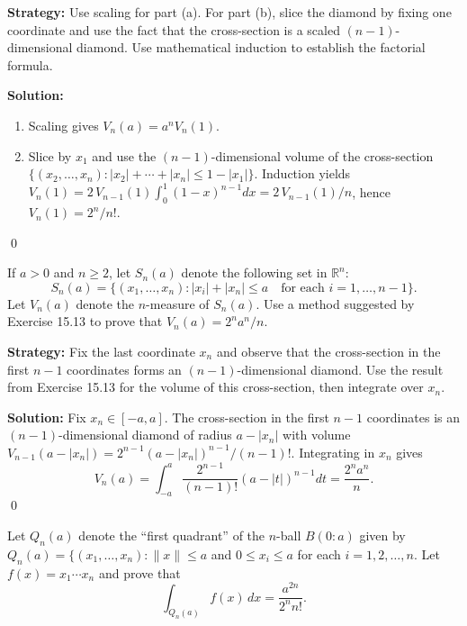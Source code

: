 \noindent\textbf{Strategy:} Use scaling for part (a). For part (b), slice the diamond by fixing one coordinate and use the fact that the cross-section is a scaled \((n-1)\)-dimensional diamond. Use mathematical induction to establish the factorial formula.

\bigskip\noindent\textbf{Solution:}
\begin{enumerate}[label=(\alph*)]
\item Scaling gives \(V_n(a)=a^n V_n(1)\).
\item Slice by \(x_1\) and use the \((n-1)\)-dimensional volume of the cross-section \(\{(x_2,\ldots,x_n): |x_2|+\cdots+|x_n|\le 1-|x_1|\}\). Induction yields
\(V_n(1)=2\,V_{n-1}(1)\int_0^1 (1-x)^{n-1}dx=2\,V_{n-1}(1)/n\), hence \(V_n(1)=2^n/n!\).
\end{enumerate}\qed


\begin{problembox}
\begin{problemstatement}
If \( a > 0 \) and \( n \geq 2 \), let \( S_n(a) \) denote the following set in \( \mathbb{R}^n \):
\[
S_n(a) = \{(x_1, \ldots, x_n): |x_i| + |x_n| \leq a \quad \text{for each } i = 1, \ldots, n - 1\}.
\]
Let \( V_n(a) \) denote the \( n \)-measure of \( S_n(a) \). Use a method suggested by Exercise 15.13 to prove that \( V_n(a) = 2^n a^n / n \).
\end{problemstatement}
\end{problembox}

\noindent\textbf{Strategy:} Fix the last coordinate \(x_n\) and observe that the cross-section in the first \(n-1\) coordinates forms an \((n-1)\)-dimensional diamond. Use the result from Exercise 15.13 for the volume of this cross-section, then integrate over \(x_n\).

\bigskip\noindent\textbf{Solution:}
Fix \(x_n\in[-a,a]\). The cross-section in the first \(n-1\) coordinates is an \((n-1)\)-dimensional diamond of radius \(a-|x_n|\) with volume \(V_{n-1}(a-|x_n|)=2^{n-1}(a-|x_n|)^{n-1}/(n-1)!\). Integrating in \(x_n\) gives
\[
V_n(a)=\int_{-a}^{a} \frac{2^{n-1}}{(n-1)!} (a-|t|)^{n-1} dt = \frac{2^n a^n}{n}.
\]\qed


\begin{problembox}
\begin{problemstatement}
Let \( Q_n(a) \) denote the ``first quadrant'' of the \( n \)-ball \( B(0:a) \) given by
$Q_n(a) = \{(x_1, \ldots, x_n): \|x\| \leq a$ and $ 0 \leq x_i \leq a $ for each $ i = 1, 2, \ldots, n.$
Let \( f(x) = x_1 \cdots x_n \) and prove that
\[
\int_{Q_n(a)} f(x) \, dx = \frac{a^{2n}}{2^n n!}.
\]
\end{problemstatement}
\end{problembox}

